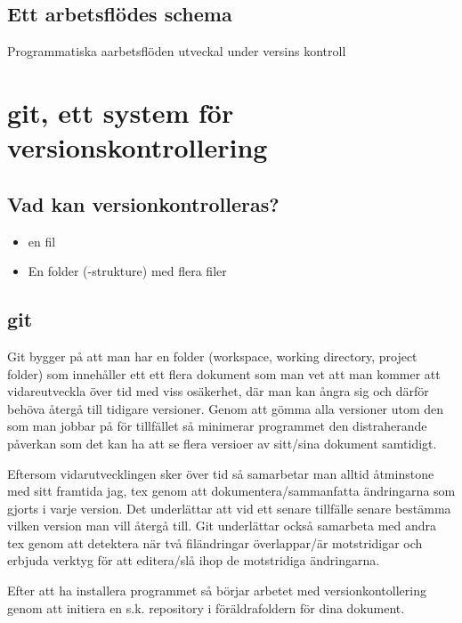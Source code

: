 \documentclass[
  letterpaper,
  DIV=11,
  numbers=noendperiod]{scrreprt}
\begin{document}
\section{Ett arbetsflödes schema}\label{ett-arbetsfluxf6des-schema}

Programmatiska aarbetsflöden utveckal under versins kontroll


\chapter{git, ett system för
versionskontrollering}\label{git-ett-system-fuxf6r-versionskontrollering}

\section{Vad kan
versionkontrolleras?}\label{vad-kan-versionkontrolleras}

\begin{itemize}
\item
  en fil
\item
  En folder (-strukture) med flera filer
\end{itemize}

\section{git}\label{git}

Git bygger på att man har en folder (workspace, working directory,
project folder) som innehåller ett ett flera dokument som man vet att
man kommer att vidareutveckla över tid med viss osäkerhet, där man kan
ångra sig och därför behöva återgå till tidigare versioner. Genom att
gömma alla versioner utom den som man jobbar på för tillfället så
minimerar programmet den distraherande påverkan som det kan ha att se
flera versioer av sitt/sina dokument samtidigt.

Eftersom vidarutvecklingen sker över tid så samarbetar man alltid
åtminstone med sitt framtida jag, tex genom att dokumentera/sammanfatta
ändringarna som gjorts i varje version. Det underlättar att vid ett
senare tillfälle senare bestämma vilken version man vill återgå till.
Git underlättar också samarbeta med andra tex genom att detektera när
två filändringar överlappar/är motstridigar och erbjuda verktyg för att
editera/slå ihop de motstridiga ändringarna.

Efter att ha installera programmet så börjar arbetet med
versionkontollering genom att initiera en s.k. repository i
föräldrafoldern för dina dokument.
\end{document}
